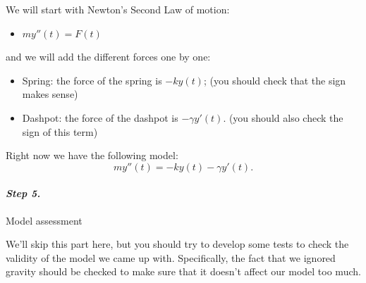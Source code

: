 \begin{example}
We will start with Newton's Second Law of motion:
\begin{itemize}
	\item $m y''(t) = F(t)$ \\
\end{itemize}

and we will  add the different forces one by one:
\begin{itemize}
	\item Spring: the force of the spring is \quad $- k y(t)$; \hfill (you should check that the sign makes sense)
	\item Dashpot: the force of the dashpot is \quad $- \gamma y'(t)$. \hfill (you should also check the sign of this term) \\
\end{itemize}

Right now we have the following model:
$$
m y''(t) = -ky(t) - \gamma y'(t).
$$

\end{example}


\paragraph{\emph{Step 5.}} Model assessment

We'll skip this part here, but you should try to develop some tests to check the validity of the model we came up with.
Specifically, the fact that we ignored gravity should be checked to make sure that it doesn't affect our model too much.

%




